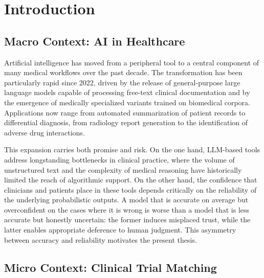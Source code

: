 
\chapter{Introduction}
\label{chap:introduction}

\section{Macro Context: AI in Healthcare}
\label{sec:intro-macro}

Artificial intelligence has moved from a peripheral tool to a central 
component of many medical workflows over the past decade. The 
transformation has been particularly rapid since 2022, driven by the 
release of general-purpose large language models capable of processing 
free-text clinical documentation and by the emergence of medically 
specialized variants trained on biomedical corpora. Applications now 
range from automated summarization of patient records to differential 
diagnosis, from radiology report generation to the identification of 
adverse drug interactions.

This expansion carries both promise and risk. On the one hand, LLM-based 
tools address longstanding bottlenecks in clinical practice, where the 
volume of unstructured text and the complexity of medical reasoning 
have historically limited the reach of algorithmic support. On the 
other hand, the confidence that clinicians and patients place in these 
tools depends critically on the reliability of the underlying 
probabilistic outputs. A model that is accurate on average but 
overconfident on the cases where it is wrong is worse than a model that 
is less accurate but honestly uncertain: the former induces misplaced 
trust, while the latter enables appropriate deference to human 
judgment. This asymmetry between accuracy and reliability motivates the 
present thesis.

\section{Micro Context: Clinical Trial Matching}
\label{sec:intro-micro}

